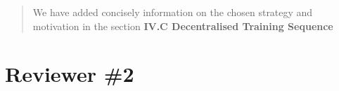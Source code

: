 \documentclass{article}
\begin{document}
%

\begin{quote}
    We have added concisely information on the chosen strategy and motivation in the section \textbf{IV.C Decentralised Training Sequence}
\end{quote}


\newpage
\headall

\section{Reviewer \#2}
\end{document}
